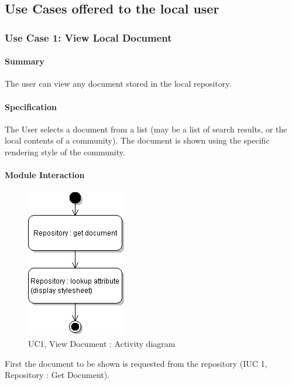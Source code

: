 \documentclass[titlepage]{article}%
\begin{document}
\subsection{Use Cases offered to the local user}
\label{sec:usecaselist} %

\subsubsection{Use Case 1: View Local Document}
\label{uc1}

\paragraph{Summary}
The user can view any document stored in the local repository.

\paragraph{Specification}
The User selects a document from a list (may be a list of search results, or the local contents of a community). The document is shown using the specific rendering style of the community.

\paragraph{Module Interaction}
\begin{figure}[htb]
\centering
	\includegraphics[scale=0.5]{diagrams/uc2-viewdocument.png}
	\caption{UC1, View Document : Activity diagram}
	\label{fig:uc1}
\end{figure}

First the document to be shown is requested from the repository (IUC 1, Repository : Get Document).
\end{document}
